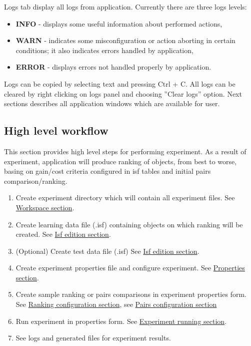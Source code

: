 Logs tab display all logs from application. 
Currently there are three logs levels:
\begin{itemize}
	\item \textbf{INFO} - displays some useful information about performed actions,
	\item \textbf{WARN} - indicates some misconfiguration or action aborting in certain conditions; it also indicates errors handled by application,
	\item \textbf{ERROR} - displays errors not handled properly by application.
\end{itemize}

Logs can be copied by selecting text and pressing Ctrl + C. All logs can be cleared by right clicking on logs panel and choosing ''Clear logs'' option.
\newline\newline
Next sections describes all application windows which are available for user.

\subsection{High level workflow}\label{sub:overview-flow}

This section provides high level steps for performing experiment. As a result of experiment, application will produce ranking of objects, from best to worse, basing on gain/cost criteria configured in isf tables and initial pairs comparison/ranking.

\begin{enumerate}
	\item Create experiment directory which will contain all experiment files.
	See \hyperref[section:workspace]{Workspace section}.
	\item Create learning data file (.isf) containing objects on which ranking will be created.
	See \hyperref[section:isf-table]{Isf edition section}.
	\item (Optional) Create test data file (.isf)
	See \hyperref[section:isf-table]{Isf edition section}.
	\item Create experiment properties file and configure experiment.
	See \hyperref[section:properties]{Properties section}.
	\item Create sample ranking or pairs comparisons in experiment properties form.
	See \hyperref[sub:properties-ranking]{Ranking configuration section},
	see \hyperref[sub:properties-pairs]{Pairs configuration section}
	\item Run experiment in properties form.
	See \hyperref[section:experiment-running]{Experiment running section}.
	\item See logs and generated files for experiment results.
\end{enumerate}

